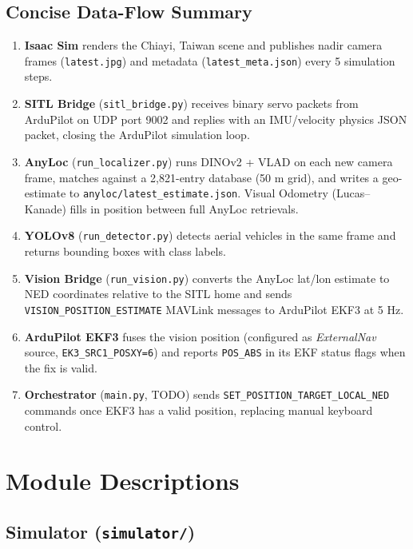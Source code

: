 \documentclass[11pt,a4paper]{article}
\begin{document}
\newpage

\subsection*{Concise Data-Flow Summary}

\begin{enumerate}
  \item \textbf{Isaac Sim} renders the Chiayi, Taiwan scene and publishes nadir camera frames (\texttt{latest.jpg}) and metadata (\texttt{latest\_meta.json}) every 5 simulation steps.
  \item \textbf{SITL Bridge} (\texttt{sitl\_bridge.py}) receives binary servo packets from ArduPilot on UDP port 9002 and replies with an IMU/velocity physics JSON packet, closing the ArduPilot simulation loop.
  \item \textbf{AnyLoc} (\texttt{run\_localizer.py}) runs DINOv2 + VLAD on each new camera frame, matches against a 2,821-entry database (50 m grid), and writes a geo-estimate to \texttt{anyloc/latest\_estimate.json}.  Visual Odometry (Lucas--Kanade) fills in position between full AnyLoc retrievals.
  \item \textbf{YOLOv8} (\texttt{run\_detector.py}) detects aerial vehicles in the same frame and returns bounding boxes with class labels.
  \item \textbf{Vision Bridge} (\texttt{run\_vision.py}) converts the AnyLoc lat/lon estimate to NED coordinates relative to the SITL home and sends \texttt{VISION\_POSITION\_ESTIMATE} MAVLink messages to ArduPilot EKF3 at 5 Hz.
  \item \textbf{ArduPilot EKF3} fuses the vision position (configured as \textit{ExternalNav} source, \texttt{EK3\_SRC1\_POSXY=6}) and reports \texttt{POS\_ABS} in its EKF status flags when the fix is valid.
  \item \textbf{Orchestrator} (\texttt{main.py}, TODO) sends \texttt{SET\_POSITION\_TARGET\_LOCAL\_NED} commands once EKF3 has a valid position, replacing manual keyboard control.
\end{enumerate}

\section{Module Descriptions}
\label{sec:modules}

\subsection{Simulator (\texttt{simulator/})}
\label{sec:sim}
\end{document}
